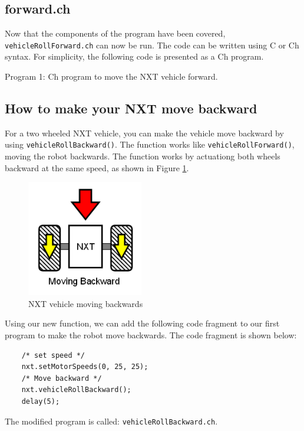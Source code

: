 \subsection{forward.ch}
Now that the components of the program have been covered, \verb+vehicleRollForward.ch+ can now be run.
The code can be written using C or Ch syntax. For simplicity, the following code is presented as a Ch
program.


\begin{center}
Program 1: Ch program to move the NXT vehicle forward.
\end{center}

\subsection{How to make your NXT move backward}
For a two wheeled NXT vehicle, you can make the vehicle move backward by using \verb+vehicleRollBackward()+. 
The function works like \verb+vehicleRollForward()+, moving the robot backwards. The function 
works by actuationg both wheels backward at the same speed, as shown in Figure \ref{fig_NXT_backward}.
\begin{figure}[h]
  \begin{center}
    \includegraphics[height=2in]{figure/mindstorm/Vehicle_back.png}
    \caption{NXT vehicle moving backwards\label{fig_NXT_backward}}
  \end{center}
\end{figure}
Using our new function, we can add the following code fragment to our first program to make the robot
move backwards. The code fragment is shown below:
\begin{verbatim}
    /* set speed */
    nxt.setMotorSpeeds(0, 25, 25);
    /* Move backward */
    nxt.vehicleRollBackward();
    delay(5);
\end{verbatim}
\noindent
The modified program is called: \verb+vehicleRollBackward.ch+.

